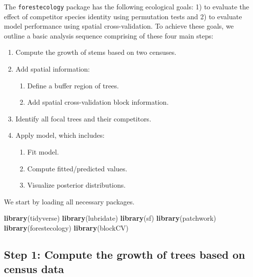 \documentclass[12pt]{article}
\providecommand{\tightlist}{%
  \setlength{\itemsep}{0pt}\setlength{\parskip}{0pt}}
\newenvironment{Shaded}{\begin{snugshade}}{\end{snugshade}}
\newcommand{\KeywordTok}[1]{\textcolor[rgb]{0.13,0.29,0.53}{\textbf{#1}}}
\newcommand{\NormalTok}[1]{#1}
\begin{document}
The \texttt{forestecology} package has the following ecological goals:
1) to evaluate the effect of competitor species identity using
permutation tests and 2) to evaluate model performance using spatial
cross-validation. To achieve these goals, we outline a basic analysis
sequence comprising of these four main steps:

\begin{enumerate}
\def\labelenumi{\arabic{enumi}.}
\tightlist
\item
  Compute the growth of stems based on two censuses.
\item
  Add spatial information:

  \begin{enumerate}
  \def\labelenumii{\arabic{enumii}.}
  \tightlist
  \item
    Define a buffer region of trees.
  \item
    Add spatial cross-validation block information.
  \end{enumerate}
\item
  Identify all focal trees and their competitors.
\item
  Apply model, which includes:

  \begin{enumerate}
  \def\labelenumii{\arabic{enumii}.}
  \tightlist
  \item
    Fit model.
  \item
    Compute fitted/predicted values.
  \item
    Visualize posterior distributions.
  \end{enumerate}
\end{enumerate}

We start by loading all necessary packages.

\begin{Shaded}
\begin{Highlighting}[]
\KeywordTok{library}\NormalTok{(tidyverse)}
\KeywordTok{library}\NormalTok{(lubridate)}
\KeywordTok{library}\NormalTok{(sf)}
\KeywordTok{library}\NormalTok{(patchwork)}
\KeywordTok{library}\NormalTok{(forestecology)}
\KeywordTok{library}\NormalTok{(blockCV)}
\end{Highlighting}
\end{Shaded}

\hypertarget{step-1-compute-the-growth-of-trees-based-on-census-data}{%
\subsection{Step 1: Compute the growth of trees based on census
data}\label{step-1-compute-the-growth-of-trees-based-on-census-data}}
\end{document}
